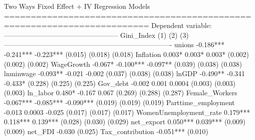  Two Ways Fixed Effect + IV Regression Models =========================================================================                                       Dependent variable:                                        --------------------------------------------------                                            Gini_Index                                                  (1)              (2)              (3)        ------------------------------------------------------------------------- unions                    -0.186***        -0.241***        -0.223***                                (0.015)          (0.018)          (0.018)                                                                                Inflation                   0.003*           0.003*           0.003*                                 (0.002)          (0.002)          (0.002)                                                                                WageGrowth                 -0.067*         -0.100***         -0.097**                                (0.039)          (0.038)          (0.038)                                                                                lnminwage                  -0.093**          -0.021           -0.002                                 (0.037)          (0.038)          (0.038)                                                                                lnGDP                      -0.490**          -0.341          -0.433*                                 (0.228)          (0.225)          (0.225)                                                                                Gov_debt                    -0.002           0.001            0.0004                                 (0.003)          (0.003)          (0.003)                                                                                ln_labor                    0.480*           -0.167           0.067                                  (0.269)          (0.288)          (0.287)                                                                                Female_Workers            -0.067***        -0.085***        -0.090***                                (0.019)          (0.019)          (0.019)                                                                                Parttime_employment         -0.013           0.0003           -0.025                                 (0.017)          (0.017)          (0.017)                                                                                WomenUnemployment_rate     0.179***         0.118***         0.139***                                (0.028)          (0.030)          (0.029)                                                                                net_export                                  0.050***         0.039***                                                 (0.009)          (0.009)                                                                                net_FDI                                                       -0.030                                                                   (0.025)                                                                                Tax_contribution                                            -0.051***                                                                  (0.010)                                        